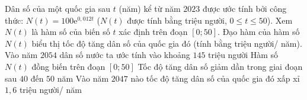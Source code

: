 \begin{ex}%
Dân số của một quốc gia sau $t$ (năm) kể từ năm $2023$ được ước tính bởi công thức: $N(t)=100 \mathrm{e}^{0{,}012 t}$ (${N}({t})$ được tính bằng triệu người, $0 \leq t \leq 50$). Xem ${N}({t})$ là hàm số của biến số $t$ xác định trên đoạn $[0 ; 50]$. Đạo hàm của hàm số ${N}({t})$ biểu thị tốc độ tăng dân số của quốc gia đó (tính bằng triệu người/ năm).
\choiceTF
{\True Vào năm $2054$ dân số nước ta ước tính vào khoảng $145$ triệu người}
{\True Hàm số $N(t)$ đồng biến trên đoạn $[0 ; 50]$}
{Tốc độ tăng dân số giảm dần trong giai đoạn sau $40$ đến $50$ năm}
{\True Vào năm $2047$ nào tốc độ tăng dân số của quốc gia đó xấp xỉ $1{,}6$ triệu người/ năm}

\end{ex}

